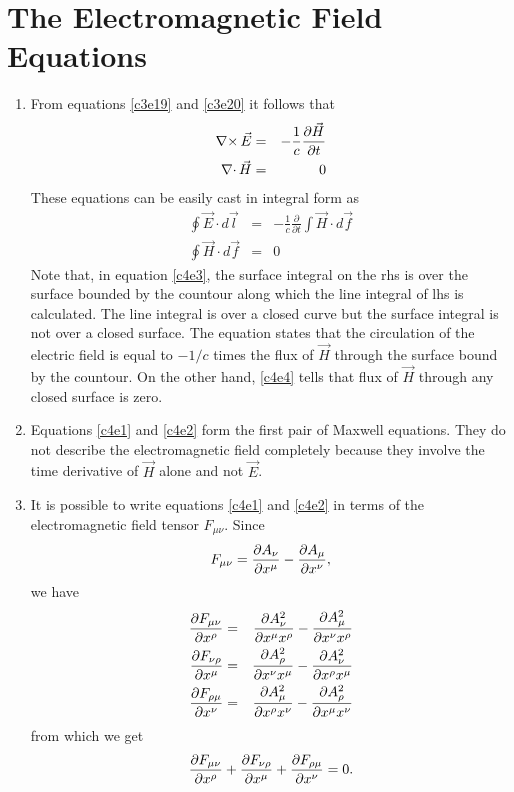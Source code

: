 \chapter{The Electromagnetic Field Equations}\label{c4}
\begin{enumerate}
\item From equations \eqref{c3e19} and \eqref{c3e20} it follows that
\begin{eqnarray}
\operatorname{\nabla\times}\vec{E} &=& -\frac{1}{c}\frac{\partial{\vec{H}}}{\partial{t}} \label{c4e1} \\
\operatorname{\nabla\cdot}\vec{H} &=& 0 \label{c4e2}
\end{eqnarray}
These equations can be easily cast in integral form as 
\begin{eqnarray}
\oint\vec{E}\cdot d\vec{l} &=& -\frac{1}{c}\frac{\partial}{\partial t}\int\vec{H}\cdot d\vec{f} \label{c4e3} \\
\oint\vec{H}\cdot d\vec{f} &=& 0 \label{c4e4}
\end{eqnarray}
Note that, in equation \eqref{c4e3}, the surface integral on the rhs is over the
surface bounded by the countour along which the line integral of lhs is calculated.
The line integral is over a closed curve but the surface integral is not over a 
closed surface. The equation states that the circulation of the electric field
is equal to $-1/c$ times the flux of $\vec{H}$ through the surface bound by the
countour. On the other hand, \eqref{c4e4} tells that flux of $\vec{H}$ through
any closed surface is zero.

\item Equations \eqref{c4e1} and \eqref{c4e2} form the first pair of Maxwell
equations. They do not describe the electromagnetic field completely because
they involve the time derivative of $\vec{H}$ alone and not $\vec{E}$.

\item It is possible to write equations \eqref{c4e1} and \eqref{c4e2} in terms
of the electromagnetic field tensor $F_{\mu\nu}$. Since
\[
F_{\mu\nu} = \frac{\partial{A_\nu}}{\partial{x^\mu}} - \frac{\partial{A_\mu}}{\partial{x^\nu}},
\]
we have
\begin{eqnarray*}
\frac{\partial{F_{\mu\nu}}}{\partial{x^\rho}} &=& \frac{\partial{A^2_\nu}}{\partial{x^\mu x^\rho}} - \frac{\partial{A^2_\mu}}{\partial{x^\nu x^\rho}} \\
\frac{\partial{F_{\nu\rho}}}{\partial{x^\mu}} &=& \frac{\partial{A^2_\rho}}{\partial{x^\nu x^\mu}} - \frac{\partial{A^2_\nu}}{\partial{x^\rho x^\mu}} \\
\frac{\partial{F_{\rho\mu}}}{\partial{x^\nu}} &=& \frac{\partial{A^2_\mu}}{\partial{x^\rho x^\nu}} - \frac{\partial{A^2_\rho}}{\partial{x^\mu x^\nu}}
\end{eqnarray*}
from which we get
\begin{equation}\label{c4e5}
\frac{\partial{F_{\mu\nu}}}{\partial{x^\rho}} + \frac{\partial{F_{\nu\rho}}}{\partial{x^\mu}} + \frac{\partial{F_{\rho\mu}}}{\partial{x^\nu}} = 0.
\end{equation}


\end{enumerate}
